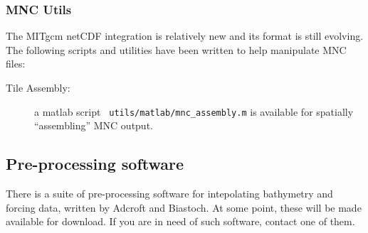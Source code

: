 \subsubsection{MNC Utils}

The MITgcm netCDF integration is relatively new and its format is
still evolving.  The following scripts and utilities have been written
to help manipulate MNC files:
\begin{description}
\item[Tile Assembly:] a matlab script {\tt
    utils/matlab/mnc\_assembly.m} is available for spatially
  ``assembling'' MNC output.

\end{description}


\subsection{Pre-processing software}

There is a suite of pre-processing software for intepolating
bathymetry and forcing data, written by Adcroft and Biastoch. At some
point, these will be made available for download. If you are in need
of such software, contact one of them.

